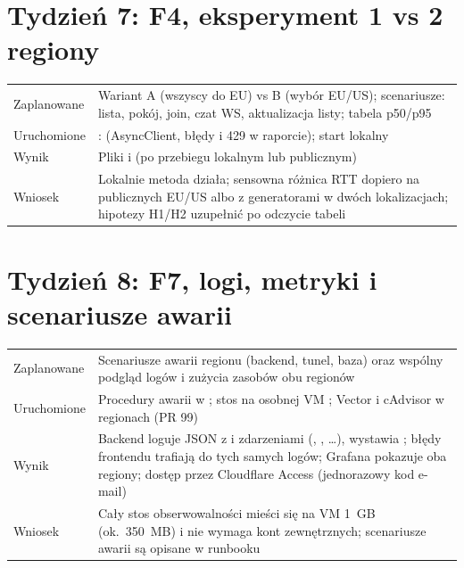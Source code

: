 \section{Tydzień 7: F4, eksperyment 1 vs 2 regiony}
\begin{tabularx}{\textwidth}{@{}p{}Y@{}}
\toprule
Zaplanowane & Wariant A (wszyscy do EU) vs B (wybór EU/US); scenariusze: lista, pokój, join, czat WS, aktualizacja listy; tabela p50/p95 \\
Uruchomione & :  (AsyncClient, błędy i 429 w raporcie); start lokalny  \\
Wynik & Pliki  i  (po przebiegu lokalnym lub publicznym) \\
Wniosek & Lokalnie metoda działa; sensowna różnica RTT dopiero na publicznych EU/US albo z generatorami w dwóch lokalizacjach; hipotezy H1/H2 uzupełnić po odczycie tabeli \\
\bottomrule
\end{tabularx}

\section{Tydzień 8: F7, logi, metryki i scenariusze awarii}
\begin{tabularx}{\textwidth}{@{}p{}Y@{}}
\toprule
Zaplanowane & Scenariusze awarii regionu (backend, tunel, baza) oraz wspólny podgląd logów i zużycia zasobów obu regionów \\
Uruchomione & Procedury awarii w ; stos  na osobnej VM ; Vector i cAdvisor w regionach (PR 99) \\
Wynik & Backend loguje JSON z  i zdarzeniami (, , \ldots), wystawia ; błędy frontendu trafiają do tych samych logów; Grafana pokazuje oba regiony; dostęp przez Cloudflare Access (jednorazowy kod e-mail) \\
Wniosek & Cały stos obserwowalności mieści się na VM 1~GB (ok.\ 350~MB) i nie wymaga kont zewnętrznych; scenariusze awarii są opisane w runbooku \\
\bottomrule
\end{tabularx}

